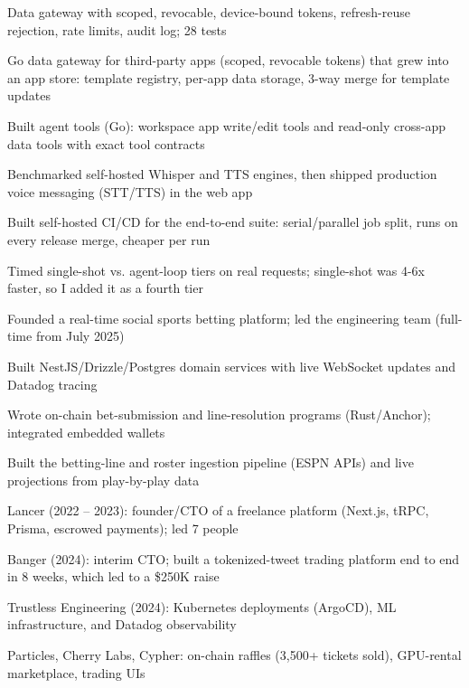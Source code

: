 \documentclass[print]{jack-resume}
\begin{document}
\begin{tightemize}
    \item Data gateway with scoped, revocable, device-bound tokens, refresh-reuse rejection, rate limits, audit log; 28 tests
    \item Go data gateway for third-party apps (scoped, revocable tokens) that grew into an app store: template registry, per-app data storage, 3-way merge for template updates
    \item Built agent tools (Go): workspace app write/edit tools and read-only cross-app data tools with exact tool contracts
    \item Benchmarked self-hosted Whisper and TTS engines, then shipped production voice messaging (STT/TTS) in the web app
    \item Built self-hosted CI/CD for the end-to-end suite: serial/parallel job split, runs on every release merge, cheaper per run
    \item Timed single-shot vs. agent-loop tiers on real requests; single-shot was 4-6x faster, so I added it as a fourth tier
\end{tightemize}
\sectionsep

\begin{tightemize}
    \item Founded a real-time social sports betting platform; led the engineering team (full-time from July 2025)
    \item Built NestJS/Drizzle/Postgres domain services with live WebSocket updates and Datadog tracing
    \item Wrote on-chain bet-submission and line-resolution programs (Rust/Anchor); integrated embedded wallets
    \item Built the betting-line and roster ingestion pipeline (ESPN APIs) and live projections from play-by-play data
\end{tightemize}
\sectionsep

\begin{tightemize}
    \item Lancer (2022 – 2023): founder/CTO of a freelance platform (Next.js, tRPC, Prisma, escrowed payments); led 7 people
    \item Banger (2024): interim CTO; built a tokenized-tweet trading platform end to end in 8 weeks, which led to a \$250K raise
    \item Trustless Engineering (2024): Kubernetes deployments (ArgoCD), ML infrastructure, and Datadog observability
    \item Particles, Cherry Labs, Cypher: on-chain raffles (3,500+ tickets sold), GPU-rental marketplace, trading UIs
\end{tightemize}
\sectionsep
\end{document}
